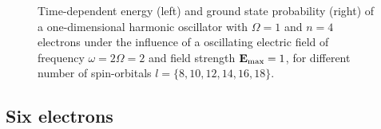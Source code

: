 \begin{figure}[h]
{\begin{minipage}{0.6\textwidth}
    \end{minipage}
    }
    \caption{Time-dependent energy (left) and ground state probability (right)
        of a one-dimensional harmonic oscillator with $\Omega=1$
        and $n=4$ electrons under the influence of a oscillating electric field 
        of frequency $\omega = 2 \Omega = 2$ and field strength $\vb{E}_\text{max}=1$,
        for different number of spin-orbitals $l=\{8,10,12,14,16,18\}$.
    }
    \label{fig:1d_n4_qd}
\end{figure}

\pagebreak

\subsection*{Six electrons}

\begin{figure}[h!]
    \centering
\end{figure}
